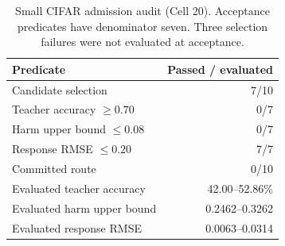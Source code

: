 \begin{table}[t]
\caption{Small CIFAR admission audit (Cell 20). Acceptance predicates have denominator seven. Three selection failures were not evaluated at acceptance.}
\label{tab:gate}\centering\small
\begin{tabularx}{\linewidth}{Yr}\toprule
Predicate & Passed / evaluated\\\midrule
Candidate selection & 7/10\\
Teacher accuracy $\ge0.70$ & 0/7\\
Harm upper bound $\le0.08$ & 0/7\\
Response RMSE $\le0.20$ & 7/7\\
Committed route & 0/10\\\midrule
Evaluated teacher accuracy & 42.00--52.86\%\\
Evaluated harm upper bound & 0.2462--0.3262\\
Evaluated response RMSE & 0.0063--0.0314\\
\bottomrule\end{tabularx}\end{table}

